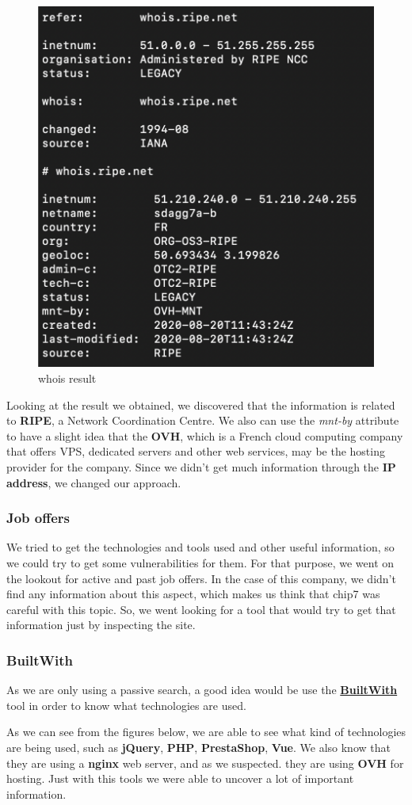 \begin{figure}[ht!]
 	\centering
 	\includegraphics[width=.5\linewidth]{img/whois4.png}
 	\caption{whois result}
\end{figure}

Looking at the result we obtained, we discovered that the information is related to \textbf{RIPE}, a Network Coordination Centre. We also can use the \textit{mnt-by} attribute to have a slight idea that the \textbf{OVH}, which is a French cloud computing company that offers VPS, dedicated servers and other web services, may be the hosting provider for the company. Since we didn't get much information through the \textbf{IP address}, we changed our approach.

\subsubsection{Job offers}
We tried to get the technologies and tools used and other useful information, so we could try to get some vulnerabilities for them. For that purpose, we went on the lookout for active and past job offers. In the case of this company, we didn't find any information about this aspect, which makes us think that chip7 was careful with this topic. So, we went looking for a tool that would try to get that information just by inspecting the site. 

\subsubsection{BuiltWith}

As we are only using a passive search, a good idea would be use the \textbf{\href{https://builtwith.com/detailed/chip7.pt}{BuiltWith}} tool in order to know what technologies are used. 

As we can see from the figures below, we are able to see what kind of technologies are being used, such as \textbf{jQuery}, \textbf{PHP}, \textbf{PrestaShop}, \textbf{Vue}. We also know that they are using a \textbf{nginx} web server, and as we suspected. they are using \textbf{OVH} for hosting. Just with this tools we were able to uncover a lot of important information.

